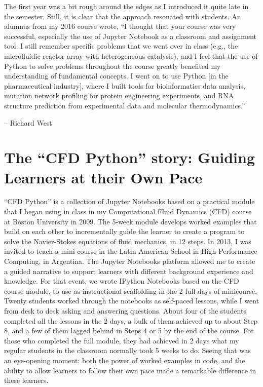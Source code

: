 \documentclass[]{book}
\begin{document}
The first year was a bit rough around the edges as I introduced it quite
late in the semester. Still, it is clear that the approach resonated
with students. An alumnus from my 2016 course wrote, ``I thought that
your course was very successful, especially the use of Jupyter Notebook
as a classroom and assignment tool. I still remember specific problems
that we went over in class (e.g., the microfluidic reactor array with
heterogeneous catalysis), and I feel that the use of Python to solve
problems throughout the course greatly benefited my understanding of
fundamental concepts. I went on to use Python {[}in the pharmaceutical
industry{]}, where I built tools for bioinformatics data analysis,
mutation network profiling for protein engineering experiments, and RNA
structure prediction from experimental data and molecular
thermodynamics.''

-- Richard West

\section{\texorpdfstring{The ``CFD Python'' story: Guiding Learners at
their Own
Pace}{The CFD Python story: Guiding Learners at their Own Pace}}\label{the-cfd-python-story-guiding-learners-at-their-own-pace}

``CFD Python'' is a collection of Jupyter Notebooks based on a practical
module that I began using in class in my Computational Fluid Dynamics
(CFD) course at Boston University in 2009. The 5-week module develops
worked examples that build on each other to incrementally guide the
learner to create a program to solve the Navier-Stokes equations of
fluid mechanics, in 12 steps. In 2013, I was invited to teach a
mini-course in the Latin-American School in High-Performance Computing,
in Argentina. The Jupyter Notebooks platform allowed me to create a
guided narrative to support learners with different background
experience and knowledge. For that event, we wrote IPython Notebooks
based on the CFD course module, to use as instructional scaffolding in
the 2-full-days of minicourse. Twenty students worked through the
notebooks as self-paced lessons, while I went from desk to desk asking
and answering questions. About four of the students completed all the
lessons in the 2 days, a bulk of them achieved up to about Step 8, and a
few of them lagged behind in Steps 4 or 5 by the end of the course. For
those who completed the full module, they had achieved in 2 days what my
regular students in the classroom normally took 5 weeks to do. Seeing
that was an eye-opening moment: both the power of worked examples in
code, and the ability to allow learners to follow their own pace made a
remarkable difference in these learners.
\end{document}
